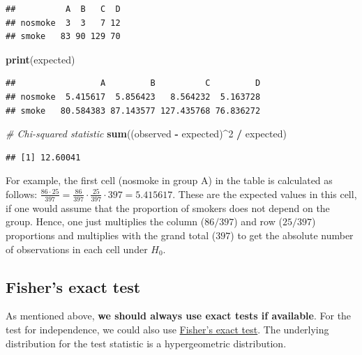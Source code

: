 \documentclass[
]{book}
\newenvironment{Shaded}{\begin{snugshade}}{\end{snugshade}}
\newcommand{\CommentTok}[1]{\textcolor[rgb]{0.56,0.35,0.01}{\textit{#1}}}
\newcommand{\DecValTok}[1]{\textcolor[rgb]{0.00,0.00,0.81}{#1}}
\newcommand{\FunctionTok}[1]{\textcolor[rgb]{0.13,0.29,0.53}{\textbf{#1}}}
\newcommand{\NormalTok}[1]{#1}
\newcommand{\SpecialCharTok}[1]{\textcolor[rgb]{0.81,0.36,0.00}{\textbf{#1}}}
\begin{document}
\begin{verbatim}
##          A  B   C  D
## nosmoke  3  3   7 12
## smoke   83 90 129 70
\end{verbatim}

\begin{Shaded}
\begin{Highlighting}[]
\FunctionTok{print}\NormalTok{(expected)}
\end{Highlighting}
\end{Shaded}

\begin{verbatim}
##                 A         B          C         D
## nosmoke  5.415617  5.856423   8.564232  5.163728
## smoke   80.584383 87.143577 127.435768 76.836272
\end{verbatim}

\begin{Shaded}
\begin{Highlighting}[]
\CommentTok{\# Chi{-}squared statistic}
\FunctionTok{sum}\NormalTok{((observed }\SpecialCharTok{{-}}\NormalTok{ expected)}\SpecialCharTok{\^{}}\DecValTok{2} \SpecialCharTok{/}\NormalTok{ expected)}
\end{Highlighting}
\end{Shaded}

\begin{verbatim}
## [1] 12.60041
\end{verbatim}

For example, the first cell (nosmoke in group A) in the table is calculated as follows:
\(\frac{86 \cdot 25}{397} = \frac{86}{397} \cdot \frac{25}{397} \cdot 397 = 5.415617\).
These are the expected values in this cell,
if one would assume that the proportion of smokers does not depend on the group.
Hence, one just multiplies the column (\(86/397\)) and row (\(25/397\)) proportions
and multiplies with the grand total (\(397\)) to get the absolute number of observations
in each cell under \(H_0\).

\subsection{Fisher's exact test}\label{fishers-exact-test}

As mentioned above, \textbf{we should always use exact tests if available}.
For the test for independence, we could also use
\href{https://en.wikipedia.org/wiki/Fisher\%27s_exact_test}{Fisher's exact test}.
The underlying distribution for the test statistic is a hypergeometric distribution.
\end{document}
